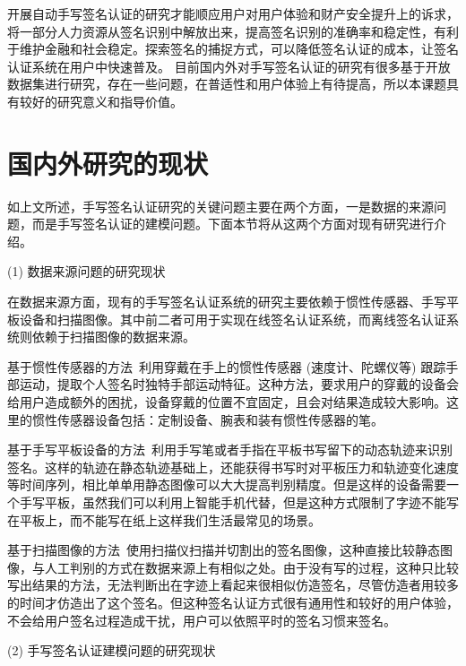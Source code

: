 开展自动手写签名认证的研究才能顺应用户对用户体验和财产安全提升上的诉求，将一部分人力资源从签名识别中解放出来，提高签名识别的准确率和稳定性，有利于维护金融和社会稳定。探索签名的捕捉方式，可以降低签名认证的成本，让签名认证系统在用户中快速普及。 目前国内外对手写签名认证的研究有很多基于开放数据集进行研究，存在一些问题，在普适性和用户体验上有待提高，所以本课题具有较好的研究意义和指导价值。

\section{国内外研究的现状}
如上文所述，手写签名认证研究的关键问题主要在两个方面，一是数据的来源问题，而是手写签名认证的建模问题。下面本节将从这两个方面对现有研究进行介绍。

(1) 数据来源问题的研究现状

在数据来源方面，现有的手写签名认证系统的研究主要依赖于惯性传感器、手写平板设备和扫描图像。其中前二者可用于实现在线签名认证系统，而离线签名认证系统则依赖于扫描图像的数据来源。

基于惯性传感器的方法~\cite{levy2018handwritten,griswold2019wearables,bunke2011online}利用穿戴在手上的惯性传感器 (速度计、陀螺仪等) 跟踪手部运动，提取个人签名时独特手部运动特征。这种方法，要求用户的穿戴的设备会给用户造成额外的困扰，设备穿戴的位置不宜固定，且会对结果造成较大影响。这里的惯性传感器设备包括：定制设备、腕表和装有惯性传感器的笔。

基于手写平板设备的方法~\cite{fischer2015robust,kholmatov2005identity,sae2013simple}利用手写笔或者手指在平板书写留下的动态轨迹来识别签名。这样的轨迹在静态轨迹基础上，还能获得书写时对平板压力和轨迹变化速度等时间序列，相比单单用静态图像可以大大提高判别精度。但是这样的设备需要一个手写平板，虽然我们可以利用上智能手机代替，但是这种方式限制了字迹不能写在平板上，而不能写在纸上这样我们生活最常见的场景。

基于扫描图像的方法~\cite{hafemann2017learning,hafemann2018fixed,ferrer2005offline,kalera2004offline}使用扫描仪扫描并切割出的签名图像，这种直接比较静态图像，与人工判别的方式在数据来源上有相似之处。由于没有写的过程，这种只比较写出结果的方法，无法判断出在字迹上看起来很相似仿造签名，尽管仿造者用较多的时间才仿造出了这个签名。但这种签名认证方式很有通用性和较好的用户体验，不会给用户签名过程造成干扰，用户可以依照平时的签名习惯来签名。

(2) 手写签名认证建模问题的研究现状

